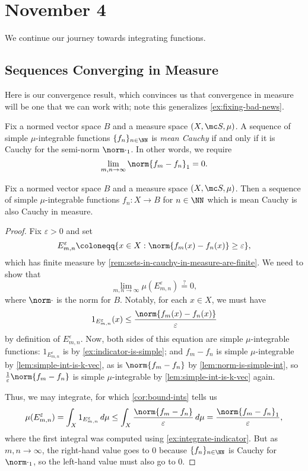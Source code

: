 \documentclass[../notes.tex]{subfiles}
\begin{document}
\section{November 4}

We continue our journey towards integrating functions.

\subsection{Sequences Converging in Measure}
Here is our convergence result, which convinces us that convergence in measure will be one that we can work with; note this generalizes \autoref{ex:fixing-bad-news}.
\begin{defi}
	Fix a normed vector space $B$ and a measure space $(X,\mc S,\mu)$. A sequence of simple $\mu$-integrable functions $\{f_n\}_{n\in\NN}$ is \textit{mean Cauchy} if and only if it is Cauchy for the semi-norm $\norm\cdot_1$. In other words, we require
	\[\lim_{m,n\to\infty}\norm{f_m-f_n}_1=0.\]
\end{defi}
\begin{lemma}
	Fix a normed vector space $B$ and a measure space $(X,\mc S,\mu)$. Then a sequence of simple $\mu$-integrable functions $f_n\colon X\to B$ for $n\in\NN$ which is mean Cauchy is also Cauchy in measure.
\end{lemma}
\begin{proof}
	Fix $\varepsilon>0$ and set
	\[E^\varepsilon_{m,n}\coloneqq\{x\in X:\norm{f_m(x)-f_n(x)}\ge\varepsilon\},\]
	which has finite measure by \autoref{rem:sets-in-cauchy-in-measure-are-finite}. We need to show that
	\[\lim_{m,n\to\infty}\mu(E_{m,n}^\varepsilon)\stackrel?=0,\]
	where $\norm\cdot$ is the norm for $B$. Notably, for each $x\in X$, we must have
	\begin{equation}
		1_{E^\varepsilon_{m,n}}(x)\le\frac{\norm{f_m(x)-f_n(x)}}\varepsilon \label{eq:bound-indicator-e-m-n}
	\end{equation}
	by definition of $E^{\varepsilon}_{m,n}$. Now, both sides of this equation are simple $\mu$-integrable functions: $1_{E^\varepsilon_{m,n}}$ is by \autoref{ex:indicator-is-simple}; and $f_m-f_n$ is simple $\mu$-integrable by \autoref{lem:simple-int-is-k-vec}, as is $\norm{f_m-f_n}$ by \autoref{lem:norm-is-simple-int}, so $\frac1\varepsilon\norm{f_m-f_n}$ is simple $\mu$-integrable by \autoref{lem:simple-int-is-k-vec} again.
	
	Thus, we may integrate, for which \autoref{cor:bound-ints} tells us
	\[\mu(E^\varepsilon_{m,n})=\int_X1_{E^{\varepsilon}_{m,n}}\,d\mu\le\int_X\frac{\norm{f_m-f_n}}\varepsilon\,d\mu=\frac{\norm{f_m-f_n}_1}\varepsilon,\]
	where the first integral was computed using \autoref{ex:integrate-indicator}. But as $m,n\to\infty$, the right-hand value goes to $0$ because $\{f_n\}_{n\in\NN}$ is Cauchy for $\norm\cdot_1$, so the left-hand value must also go to $0$.
\end{proof}
\end{document}
